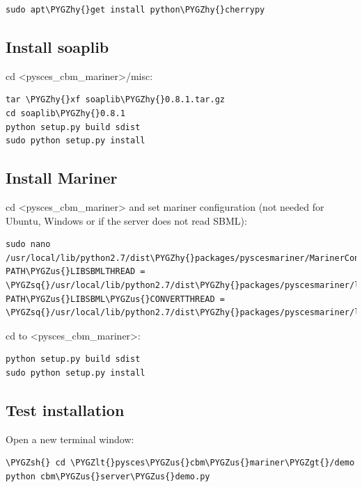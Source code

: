 \documentclass[a4paper,11pt,english]{sphinxmanual}
\def\PYGZus{\char`\_}
\def\PYGZlt{\char`\<}
\def\PYGZgt{\char`\>}
\def\PYGZsh{\char`\#}
\def\PYGZhy{\char`\-}
\def\PYGZsq{\char`\'}
\renewcommand\PYGZsq{\textquotesingle}
\begin{document}
\begin{Verbatim}[commandchars=\\\{\}]
sudo apt\PYGZhy{}get install python\PYGZhy{}cherrypy
\end{Verbatim}


\subsection{Install soaplib}
\label{install_doc:install-soaplib}
cd \textless{}pysces\_cbm\_mariner\textgreater{}/misc:

\begin{Verbatim}[commandchars=\\\{\}]
tar \PYGZhy{}xf soaplib\PYGZhy{}0.8.1.tar.gz
cd soaplib\PYGZhy{}0.8.1
python setup.py build sdist
sudo python setup.py install
\end{Verbatim}


\subsection{Install Mariner}
\label{install_doc:install-mariner}
cd \textless{}pysces\_cbm\_mariner\textgreater{} and set mariner configuration (not needed for Ubuntu, Windows or if the server does not read SBML):

\begin{Verbatim}[commandchars=\\\{\}]
sudo nano /usr/local/lib/python2.7/dist\PYGZhy{}packages/pyscesmariner/MarinerConfig.py
PATH\PYGZus{}LIBSBMLTHREAD = \PYGZsq{}/usr/local/lib/python2.7/dist\PYGZhy{}packages/pyscesmariner/libSBMLthread.pyc\PYGZsq{}
PATH\PYGZus{}LIBSBML\PYGZus{}CONVERTTHREAD = \PYGZsq{}/usr/local/lib/python2.7/dist\PYGZhy{}packages/pyscesmariner/libSBMLConvertThread.py\PYGZsq{}
\end{Verbatim}

cd to \textless{}pysces\_cbm\_mariner\textgreater{}:

\begin{Verbatim}[commandchars=\\\{\}]
python setup.py build sdist
sudo python setup.py install
\end{Verbatim}


\subsection{Test installation}
\label{install_doc:test-installation}
Open a new terminal window:

\begin{Verbatim}[commandchars=\\\{\}]
\PYGZsh{} cd \PYGZlt{}pysces\PYGZus{}cbm\PYGZus{}mariner\PYGZgt{}/demo
python cbm\PYGZus{}server\PYGZus{}demo.py
\end{Verbatim}
\end{document}
